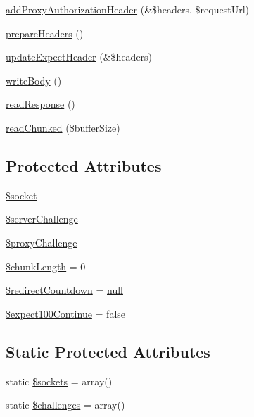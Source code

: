 \begin{DoxyCompactItemize}
\item 
\hyperlink{classHTTP__Request2__Adapter__Socket_a65649f201171f34f2db163033fbfde27}{add\+Proxy\+Authorization\+Header} (\&\$headers, \$request\+Url)
\item 
\hyperlink{classHTTP__Request2__Adapter__Socket_a8715074a6226005aa4db694a899c759b}{prepare\+Headers} ()
\item 
\hyperlink{classHTTP__Request2__Adapter__Socket_a7a547941e41ce97677f3217284a0c447}{update\+Expect\+Header} (\&\$headers)
\item 
\hyperlink{classHTTP__Request2__Adapter__Socket_a091decf5cd08db3d422e3d50dafa4122}{write\+Body} ()
\item 
\hyperlink{classHTTP__Request2__Adapter__Socket_ace322a437e3d44b48bd44c2d452e0ad0}{read\+Response} ()
\item 
\hyperlink{classHTTP__Request2__Adapter__Socket_a2a5a784d7631133a5713476ee96c62ed}{read\+Chunked} (\$buffer\+Size)
\end{DoxyCompactItemize}
\subsection*{Protected Attributes}
\begin{DoxyCompactItemize}
\item 
\hyperlink{classHTTP__Request2__Adapter__Socket_ad9f67426c07302e3867c01577fffc27b}{\$socket}
\item 
\hyperlink{classHTTP__Request2__Adapter__Socket_a39896645b7671bfc2af02c5db7853341}{\$server\+Challenge}
\item 
\hyperlink{classHTTP__Request2__Adapter__Socket_a0b3a0d18548e354e248253f67e1d5f50}{\$proxy\+Challenge}
\item 
\hyperlink{classHTTP__Request2__Adapter__Socket_add96406caddf7540cc0525dee2aa479f}{\$chunk\+Length} = 0
\item 
\hyperlink{classHTTP__Request2__Adapter__Socket_a667d94f4db2e719a1c17809a3ff3d355}{\$redirect\+Countdown} = \hyperlink{modernizr_8min_8js_a286f9ec831c5e676eeb493248eab9575}{null}
\item 
\hyperlink{classHTTP__Request2__Adapter__Socket_afd2a8a4a59755ae2fb901741774cb02c}{\$expect100\+Continue} = false
\end{DoxyCompactItemize}
\subsection*{Static Protected Attributes}
\begin{DoxyCompactItemize}
\item 
static \hyperlink{classHTTP__Request2__Adapter__Socket_ac7d848682d9289b2c270abb214338455}{\$sockets} = array()
\item 
static \hyperlink{classHTTP__Request2__Adapter__Socket_ae4456b3dff588030e66270e99d29e589}{\$challenges} = array()
\end{DoxyCompactItemize}


